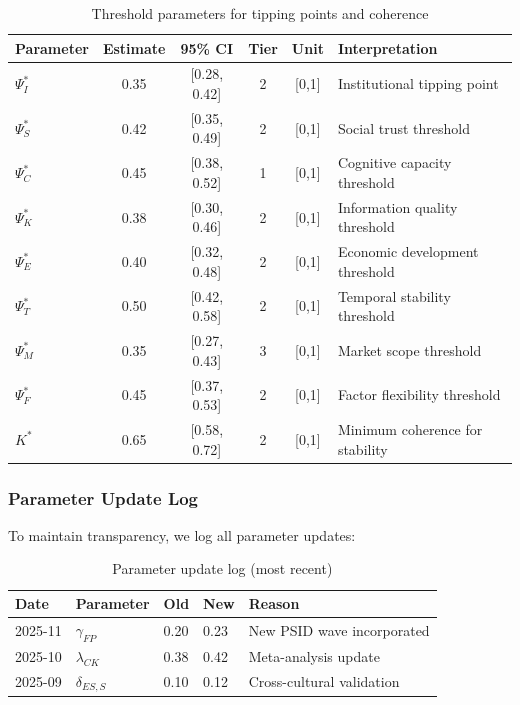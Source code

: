 \begin{table}[h]
\centering
\small
\begin{tabular}{lccccl}
\toprule
\textbf{Parameter} & \textbf{Estimate} & \textbf{95\% CI} & \textbf{Tier} & \textbf{Unit} & \textbf{Interpretation} \\
\midrule
$\Psi^*_I$ & 0.35 & [0.28, 0.42] & 2 & [0,1] & Institutional tipping point \\
$\Psi^*_S$ & 0.42 & [0.35, 0.49] & 2 & [0,1] & Social trust threshold \\
$\Psi^*_C$ & 0.45 & [0.38, 0.52] & 1 & [0,1] & Cognitive capacity threshold \\
$\Psi^*_K$ & 0.38 & [0.30, 0.46] & 2 & [0,1] & Information quality threshold \\
$\Psi^*_E$ & 0.40 & [0.32, 0.48] & 2 & [0,1] & Economic development threshold \\
$\Psi^*_T$ & 0.50 & [0.42, 0.58] & 2 & [0,1] & Temporal stability threshold \\
$\Psi^*_M$ & 0.35 & [0.27, 0.43] & 3 & [0,1] & Market scope threshold \\
$\Psi^*_F$ & 0.45 & [0.37, 0.53] & 2 & [0,1] & Factor flexibility threshold \\
\midrule
$K^*$ & 0.65 & [0.58, 0.72] & 2 & [0,1] & Minimum coherence for stability \\
\bottomrule
\end{tabular}
\caption{Threshold parameters for tipping points and coherence}
\label{tab:thresholds}
\end{table}

\subsubsection{Parameter Update Log}

To maintain transparency, we log all parameter updates:

\begin{table}[h]
\centering
\small
\begin{tabular}{lllll}
\toprule
\textbf{Date} & \textbf{Parameter} & \textbf{Old} & \textbf{New} & \textbf{Reason} \\
\midrule
2025-11 & $\gamma_{FP}$ & 0.20 & 0.23 & New PSID wave incorporated \\
2025-10 & $\lambda_{CK}$ & 0.38 & 0.42 & Meta-analysis update \\
2025-09 & $\delta_{ES,S}$ & 0.10 & 0.12 & Cross-cultural validation \\
\bottomrule
\end{tabular}
\caption{Parameter update log (most recent)}
\label{tab:update-log}
\end{table}


